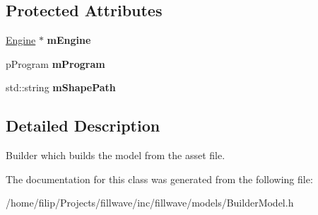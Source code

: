 \subsection*{Protected Attributes}
\begin{DoxyCompactItemize}
\item 
\hypertarget{classfillwave_1_1models_1_1BuilderModel_a28590661c540b4afa0effaa027a93931}{}\hyperlink{classfillwave_1_1Engine}{Engine} $\ast$ {\bfseries m\+Engine}\label{classfillwave_1_1models_1_1BuilderModel_a28590661c540b4afa0effaa027a93931}

\item 
\hypertarget{classfillwave_1_1models_1_1BuilderModel_aca82bb8958792ebe5cfe73971e10ba4f}{}p\+Program {\bfseries m\+Program}\label{classfillwave_1_1models_1_1BuilderModel_aca82bb8958792ebe5cfe73971e10ba4f}

\item 
\hypertarget{classfillwave_1_1models_1_1BuilderModel_a7b39d4d8e21413b1f01cf637349f5f57}{}std\+::string {\bfseries m\+Shape\+Path}\label{classfillwave_1_1models_1_1BuilderModel_a7b39d4d8e21413b1f01cf637349f5f57}

\end{DoxyCompactItemize}


\subsection{Detailed Description}
Builder which builds the model from the asset file. 

The documentation for this class was generated from the following file\+:\begin{DoxyCompactItemize}
\item 
/home/filip/\+Projects/fillwave/inc/fillwave/models/Builder\+Model.\+h\end{DoxyCompactItemize}

